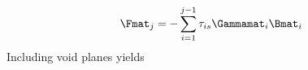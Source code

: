 \begin{equation}
  \Fmat_j = - \sum\limits_{i = 1}^{j -1}\tau_{i s} \Gammamat_i \Bmat_i
\end{equation}
Including void planes yields